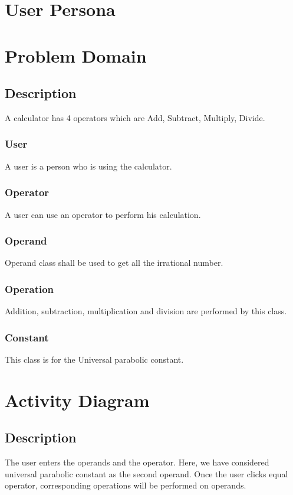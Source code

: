 \documentclass{report}
\begin{document}
\chapter{User Persona}





\newpage
\chapter{Problem Domain}

\newpage
\section{Description}
A calculator has 4 operators which are Add, Subtract, Multiply, Divide.
\subsection{User}
A user is a person who is using the calculator.
\subsection{Operator}
A user can use an operator to perform his calculation.\newline

\subsection{Operand}
Operand class shall be used to get all the irrational number. 
\subsection{Operation}
Addition, subtraction, multiplication and division are performed by this class.

\subsection{Constant}This class is for the Universal parabolic constant.
\chapter{Activity Diagram}
\section{Description}
The user enters the operands and the operator. Here, we have considered universal parabolic constant as the second operand. Once the user clicks equal operator, corresponding operations will be performed on operands.
\end{document}

